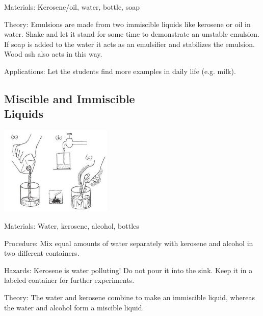 \begin{multicols}{2}
\begin{description*}
\item[Materials:]{Kerosene/oil, water, bottle, soap}
\item[Theory:]{Emulsions are made from two immiscible
liquids like kerosene or oil in water. Shake and
let it stand for some time to demonstrate an
unstable emulsion. If soap is added to the water
it acts as an emulsifier and stabilizes the
emulsion. Wood ash also acts in this way. }
\item[Applications:]{Let the students find more examples in
daily life (e.g. milk).}
\end{description*}

\subsection{Miscible and Immiscible \hfill \\ Liquids} %

\begin{center}
\includegraphics[width=0.4\textwidth]{./img/source/miscible-immiscible.jpg}
\end{center}

\begin{description*}
\item[Materials:]{Water, kerosene, alcohol, bottles}
\item[Procedure:]{Mix equal amounts of water separately with
kerosene and alcohol in two different containers.}
\item[Hazards:]{Kerosene is water polluting! Do not pour it
into the sink. Keep it in a labeled container for
further experiments.}
\item[Theory:]{The water and kerosene combine to make an immiscible liquid, whereas the water and alcohol form a miscible liquid.}
\end{description*}


\end{multicols}
